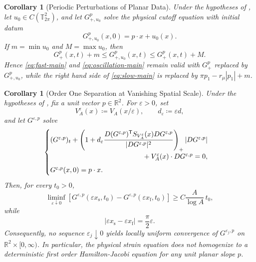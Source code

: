 \documentclass[11pt,reqno,noamsfonts]{amsart}
\newtheorem{corollary}[theorem]{Corollary}
\theoremstyle{definition}
\theoremstyle{remark}
\newcommand{\T}{\mathbb T}
\begin{document}
\begin{corollary}[Periodic Perturbations of Planar Data]
\label{cor:periodic-perturbations}
Under the hypotheses of , let
$u_0\in C(\T^2_{2\pi})$, and let $G_{+,u_0}^p$ solve the physical
cutoff equation with initial datum
\[
  G_{+,u_0}^p(x,0)=p\cdot x+u_0(x).
\]
If $m=\min u_0$ and $M=\max u_0$, then
\begin{equation}\label{eq:periodic-data-sandwich}
  G_+^p(x,t)+m
  \le G_{+,u_0}^p(x,t)
  \le G_+^p(x,t)+M.
\end{equation}
Hence \eqref{eq:fast-main} and \eqref{eq:oscillation-main} remain valid
with $G_+^p$ replaced by $G_{+,u_0}^p$, while the right hand side of
\eqref{eq:slow-main} is replaced by
$\pi p_1-r_\mu|p_1|+m$.
\end{corollary}

\begin{corollary}[Order One Separation at Vanishing Spatial Scale]
\label{cor:homogenization-fails}
Under the hypotheses of , fix a unit vector
$p\in\mathbb R^2$.  For $\varepsilon>0$, set
\[
  V_A^\varepsilon(x)\coloneqq V_A(x/\varepsilon),
  \qquad
  d_\varepsilon\coloneqq \varepsilon d,
\]
and let $G^{\varepsilon,p}$ solve
\begin{equation}\label{eq:scaled-physical}
\begin{cases}
(G^{\varepsilon,p})_t+
\left(
1+d_\varepsilon
\dfrac{
D(G^{\varepsilon,p})^{\mathsf T}
S_{V_A^\varepsilon}(x)
D G^{\varepsilon,p}
}{
|D G^{\varepsilon,p}|^2
}
\right)_+
|D G^{\varepsilon,p}|\\
\hfill{}+
V_A^\varepsilon(x)\cdot D G^{\varepsilon,p}=0,\\[0.5em]
G^{\varepsilon,p}(x,0)=p\cdot x.
\end{cases}
\end{equation}
Then, for every $t_0>0$,
\begin{equation}\label{eq:scaled-gap-main}
  \liminf_{\varepsilon\downarrow0}
  \left[
  G^{\varepsilon,p}(\varepsilon x_{\mathrm s},t_0)
  -G^{\varepsilon,p}(\varepsilon x_{\mathrm f},t_0)
  \right]
  \ge C\frac A{\log A}\,t_0,
\end{equation}
while
\[
  |\varepsilon x_{\mathrm s}-\varepsilon x_{\mathrm f}|
  =\frac\pi2\varepsilon.
\]
Consequently, no sequence $\varepsilon_j\downarrow0$ yields locally
uniform convergence of $G^{\varepsilon_j,p}$ on
$\mathbb R^2\times[0,\infty)$.  In particular, the physical strain
equation does not homogenize to a deterministic first order
Hamilton-Jacobi equation for any unit planar slope $p$.
\end{corollary}
\end{document}
